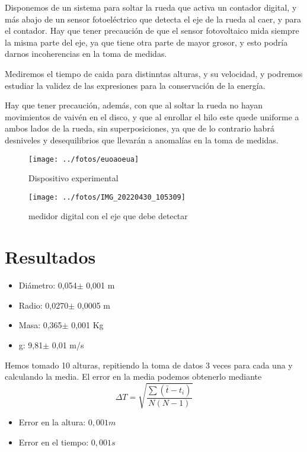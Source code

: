 \documentclass[a4paper,12pt,spanish]{article}
\begin{document}
	Disponemos de un sistema para soltar la rueda que activa un contador digital, y más abajo de un sensor fotoeléctrico que detecta el eje de la rueda al caer, y para el contador.
	Hay que tener precaución de que el sensor fotovoltaico mida siempre la misma parte del eje, ya que tiene otra parte de mayor grosor, y esto podría darnos incoherencias en la toma de medidas.
	
	Mediremos el tiempo de caida para distinntas alturas, y su velocidad, y podremos estudiar la validez de las expresiones para la conservación de la energía.
	
	Hay que tener precaución, además, con que al soltar la rueda no hayan movimientos de vaivén en el disco, y que al enrollar el hilo este quede uniforme a ambos lados de la rueda, sin superposiciones, ya que de lo contrario habrá desniveles y desequilibrios que llevarán a anomalías en la toma de medidas.
	


\begin{figure}[H]
	\centering
	\texttt{[image: ../fotos/euoaoeua]}
	\caption{Dispositivo experimental}
	\label{fig:euoaoeua}
\end{figure}
	
	
\begin{figure}[H]
	\centering
	\texttt{[image: ../fotos/IMG\_20220430\_105309]}
	\caption{medidor digital con el eje que debe detectar}
	\label{fig:img20220430105309}
\end{figure}


	\section{Resultados}
	
		
	\begin{itemize}
	\item{ Diámetro: 0,054$\pm$ 0,001 m }
	\item{ Radio: 0,0270$\pm$ 0,0005 m }
	\item{ Masa: 0,365$\pm$ 0,001 Kg }
	\item{ g: 9,81$\pm$ 0,01 m/s}
	\end{itemize}
	
	
Hemos tomado 10 alturas, repitiendo la toma de datos 3 veces para cada una y calculando la media.
El error en la media podemos obtenerlo mediante
\[\Delta T = \sqrt{\frac{\sum(\bar t-t_i)}{N(N-1)}}\]

	\begin{itemize}
	\item{Error en la altura: $0,001 \si{m}$}
	\item{Error en el tiempo: $0,001 \si{s}$}
\end{itemize}
\end{document}
